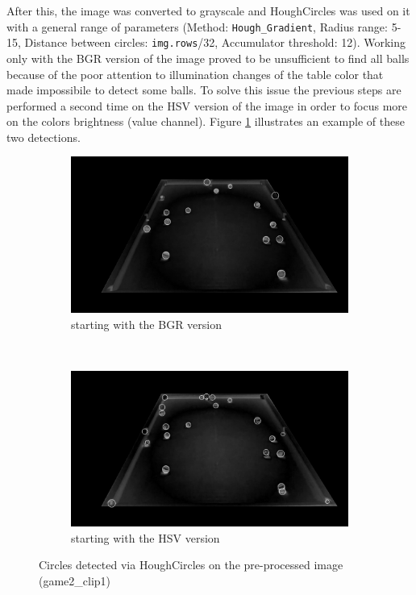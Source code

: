 After this, the image was converted to grayscale and HoughCircles was used on it with a general range
of parameters (Method: \verb|Hough_Gradient|, Radius range: 5-15, Distance between circles: \verb|img.rows|/32, Accumulator threshold: 12).
Working only with the BGR version of the image proved to be unsufficient to find all balls because of the 
poor attention to illumination changes of the table color that made impossibile to detect some balls. To solve this issue
the previous steps are performed a second time on the HSV version of the image in order to focus more on 
the colors brightness (value channel). Figure \ref{fig:circles} illustrates an example of these two detections. \\
\begin{figure}[h!]
    \centering
    \begin{subfigure}[b]{0.85\textwidth}
        \centering
        \includegraphics[width=\textwidth]{imgs/ball_localization/circlesBGR.jpg}
        \caption{starting with the BGR version}
    \end{subfigure}
    \\
    \begin{subfigure}[b]{0.85\textwidth}
        \centering
        \includegraphics[width=\textwidth]{imgs/ball_localization/circlesHSV.jpg}
        \caption{starting with the HSV version}
    \end{subfigure}
    \caption{Circles detected via HoughCircles on the pre-processed image (game2\_clip1)}
    \label{fig:circles}
\end{figure}

